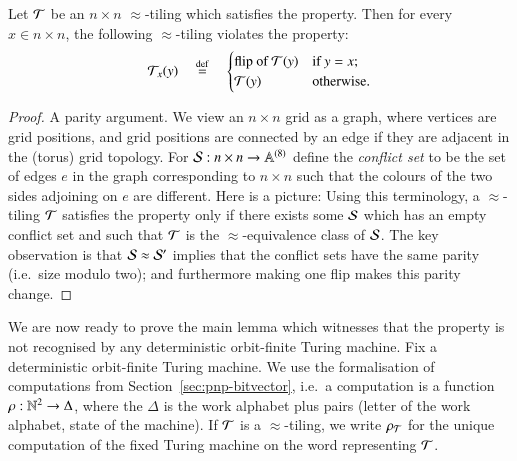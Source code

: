  \begin{lemma}\label{lem:cfi-parity}
 Let ${\mathcal T}$ be an $n \times n$ $\approx$-tiling which satisfies the \cfi property. Then for every $x \in n \times n$, the following $\approx$-tiling violates the \cfi property:
 \begin{align*}
 {\mathcal T}_x(y) \quad \stackrel {\mathrm{def}} = \quad \begin{cases}
 	\text{flip of }{\mathcal T}(y) & \mbox{if $y=x$;} \\
 	{\mathcal T}(y) & \mbox{otherwise.}
 \end{cases}
\end{align*}
\end{lemma}
\begin{proof} A parity argument. We view an $n \times n$ grid as a graph, where vertices are grid positions, and grid positions are connected by an edge if they are adjacent in the (torus) grid topology. For
$ {\mathcal S} : n \times n \to \mathbb A^{(8)}$ 
 define the \emph{conflict set} to be the set of edges $e$ in the graph corresponding to $n \times n$ such that the colours of the two sides adjoining on $e$ are different. Here is a picture:
 Using this terminology, a $\approx$-tiling ${\mathcal T}$ satisfies the \cfi property only if there exists some ${\mathcal S}$ which has an empty conflict set and such that ${\mathcal T}$ is the $\approx$-equivalence class of ${\mathcal S}$. The key observation is that ${\mathcal S} \approx {\mathcal S}'$ implies that the conflict sets have the same parity (i.e.~size modulo two); and furthermore making one flip makes this parity change.
\end{proof}


We are now ready to prove the main lemma which witnesses that the \cfi property is not recognised by any deterministic orbit-finite Turing machine. Fix a deterministic orbit-finite Turing machine. We use the formalisation of computations from Section~\ref{sec:pnp-bitvector}, i.e.~a computation is a function $\rho : {\mathbb N}^2 \to \Delta$, where the $\Delta$ is the work alphabet plus pairs (letter of the work alphabet, state of the machine). If ${\mathcal T}$ is a $\approx$-tiling, we write $\rho_{\mathcal T}$ for the unique computation of the fixed Turing machine on the word representing ${\mathcal T}$. 






